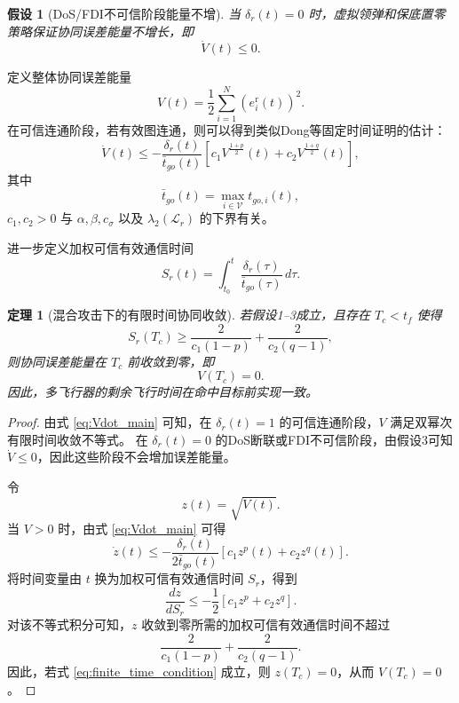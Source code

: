 \documentclass[UTF8,a4paper,11pt]{ctexart}
\newtheorem{assumption}{假设}
\newtheorem{theorem}{定理}
\begin{document}
\begin{assumption}[DoS/FDI不可信阶段能量不增]
当 $\delta_r(t)=0$ 时，虚拟领弹和保底置零策略保证协同误差能量不增长，即
\begin{equation}
\dot V(t)\le 0.
\label{eq:nonincrease}
\end{equation}
\end{assumption}

定义整体协同误差能量
\begin{equation}
V(t)=\frac{1}{2}\sum_{i=1}^N \left(e_i^{\mathrm{r}}(t)\right)^2.
\label{eq:lyapunov}
\end{equation}
在可信连通阶段，若有效图连通，则可以得到类似Dong等固定时间证明的估计：
\begin{equation}
\dot V(t)
\le
-\frac{\delta_r(t)}{\bar t_{go}(t)}
\left[
c_1 V^{\frac{1+p}{2}}(t)
+
c_2 V^{\frac{1+q}{2}}(t)
\right],
\label{eq:Vdot_main}
\end{equation}
其中
\[
\bar t_{go}(t)=\max_{i\in\mathcal{V}} t_{go,i}(t),
\]
$c_1,c_2>0$ 与 $\alpha,\beta,c_\sigma$ 以及 $\lambda_2(\mathcal{L}_r)$ 的下界有关。

进一步定义加权可信有效通信时间
\begin{equation}
S_r(t)
=
\int_{t_0}^{t}
\frac{\delta_r(\tau)}{\bar t_{go}(\tau)}
\,d\tau.
\label{eq:weighted_safe_time}
\end{equation}

\begin{theorem}[混合攻击下的有限时间协同收敛]
若假设1--3成立，且存在 $T_c<t_f$ 使得
\begin{equation}
S_r(T_c)
\ge
\frac{2}{c_1(1-p)}
+
\frac{2}{c_2(q-1)},
\label{eq:finite_time_condition}
\end{equation}
则协同误差能量在 $T_c$ 前收敛到零，即
\[
V(T_c)=0.
\]
因此，多飞行器的剩余飞行时间在命中目标前实现一致。
\end{theorem}

\begin{proof}
由式 \eqref{eq:Vdot_main} 可知，在 $\delta_r(t)=1$ 的可信连通阶段，$V$ 满足双幂次有限时间收敛不等式。
在 $\delta_r(t)=0$ 的DoS断联或FDI不可信阶段，由假设3可知 $\dot V\le 0$，因此这些阶段不会增加误差能量。

令
\[
z(t)=\sqrt{V(t)}.
\]
当 $V>0$ 时，由式 \eqref{eq:Vdot_main} 可得
\[
\dot z(t)
\le
-\frac{\delta_r(t)}{2\bar t_{go}(t)}
\left[
c_1 z^p(t)+c_2 z^q(t)
\right].
\]
将时间变量由 $t$ 换为加权可信有效通信时间 $S_r$，得到
\[
\frac{dz}{dS_r}
\le
-\frac{1}{2}
\left[
c_1 z^p+c_2 z^q
\right].
\]
对该不等式积分可知，$z$ 收敛到零所需的加权可信有效通信时间不超过
\[
\frac{2}{c_1(1-p)}
+
\frac{2}{c_2(q-1)}.
\]
因此，若式 \eqref{eq:finite_time_condition} 成立，则 $z(T_c)=0$，从而 $V(T_c)=0$。
\end{proof}
\end{document}
